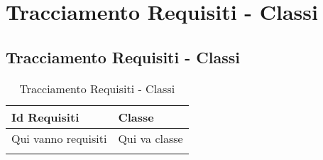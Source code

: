 \section{Tracciamento Requisiti - Classi}
\subsection{Tracciamento Requisiti - Classi}
\normalsize
\begin{longtable}{|>{\centering}m{5cm}|m{5cm}<{\centering}|}
\hline 

\textbf{Id Requisiti} & \textbf{Classe}\\
\hline
\endhead
Qui vanno requisiti & Qui va classe\\
\hline

\caption[Tracciamento Requisiti - Classi]{Tracciamento Requisiti - Classi}
\label{tabella: Tracciamento Requisiti - Classi}
\end{longtable}
\newpage